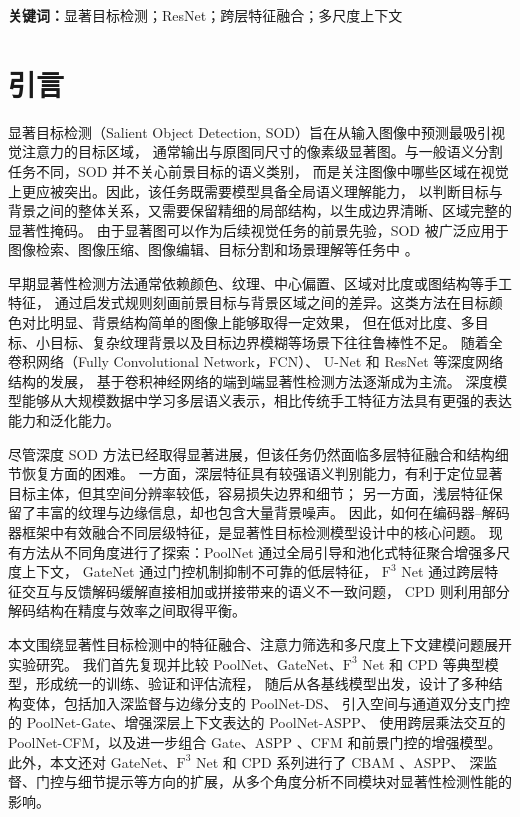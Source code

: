 \documentclass[UTF8,a4paper,10pt]{ctexart}
\begin{document}
\bigskip
\noindent\textbf{关键词：}显著目标检测；ResNet；跨层特征融合；多尺度上下文

\section{引言}

显著目标检测（Salient Object Detection, SOD）旨在从输入图像中预测最吸引视觉注意力的目标区域，
通常输出与原图同尺寸的像素级显著图。与一般语义分割任务不同，SOD 并不关心前景目标的语义类别，
而是关注图像中哪些区域在视觉上更应被突出。因此，该任务既需要模型具备全局语义理解能力，
以判断目标与背景之间的整体关系，又需要保留精细的局部结构，以生成边界清晰、区域完整的显著性掩码。
由于显著图可以作为后续视觉任务的前景先验，SOD 被广泛应用于图像检索、图像压缩、图像编辑、目标分割和场景理解等任务中
\cite{borji2014salient,wang2019salient}。

早期显著性检测方法通常依赖颜色、纹理、中心偏置、区域对比度或图结构等手工特征，
通过启发式规则刻画前景目标与背景区域之间的差异。这类方法在目标颜色对比明显、背景结构简单的图像上能够取得一定效果，
但在低对比度、多目标、小目标、复杂纹理背景以及目标边界模糊等场景下往往鲁棒性不足。
随着全卷积网络（Fully Convolutional Network，FCN）\cite{long2015fully}、
U-Net \cite{ronneberger2015unet} 和 ResNet \cite{he2016deep} 等深度网络结构的发展，
基于卷积神经网络的端到端显著性检测方法逐渐成为主流。
深度模型能够从大规模数据中学习多层语义表示，相比传统手工特征方法具有更强的表达能力和泛化能力。

尽管深度 SOD 方法已经取得显著进展，但该任务仍然面临多层特征融合和结构细节恢复方面的困难。
一方面，深层特征具有较强语义判别能力，有利于定位显著目标主体，但其空间分辨率较低，容易损失边界和细节；
另一方面，浅层特征保留了丰富的纹理与边缘信息，却也包含大量背景噪声。
因此，如何在编码器--解码器框架中有效融合不同层级特征，是显著性目标检测模型设计中的核心问题。
现有方法从不同角度进行了探索：PoolNet \cite{liu2019simple} 通过全局引导和池化式特征聚合增强多尺度上下文，
GateNet \cite{zhao2020suppress} 通过门控机制抑制不可靠的低层特征，
$\text{F}^3$ Net \cite{wei2020f3net} 通过跨层特征交互与反馈解码缓解直接相加或拼接带来的语义不一致问题，
CPD \cite{wu2019cascaded} 则利用部分解码结构在精度与效率之间取得平衡。

本文围绕显著性目标检测中的特征融合、注意力筛选和多尺度上下文建模问题展开实验研究。
我们首先复现并比较 PoolNet、GateNet、$\text{F}^3$ Net 和 CPD 等典型模型，形成统一的训练、验证和评估流程，
随后从各基线模型出发，设计了多种结构变体，包括加入深监督与边缘分支的 PoolNet-DS、
引入空间与通道双分支门控的 PoolNet-Gate、增强深层上下文表达的 PoolNet-ASPP、
使用跨层乘法交互的 PoolNet-CFM，以及进一步组合 Gate、ASPP \cite{chen2017rethinking}、CFM 和前景门控的增强模型。
此外，本文还对 GateNet、$\text{F}^3$ Net 和 CPD 系列进行了 CBAM \cite{woo2018cbam}、ASPP、
深监督、门控与细节提示等方向的扩展，从多个角度分析不同模块对显著性检测性能的影响。
\end{document}
